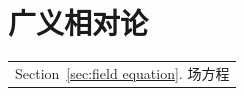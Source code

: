 \part{广义相对论}\label{Part:gr}
\begin{margintable}\vspace{1.4in}\footnotesize
	\begin{tabularx}{\marginparwidth}{|X}
		Section~\ref{sec:field equation}. 场方程\\
	\end{tabularx}
\end{margintable}


\newpage

\newpage

